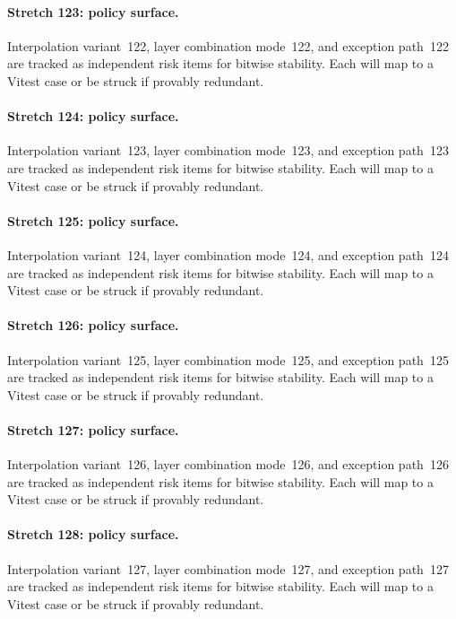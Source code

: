\documentclass[sigconf,nonacm]{acmart}
\begin{document}
\paragraph{Stretch 123: policy surface.}
Interpolation variant~122, layer combination mode~122, and exception path~122 are tracked as independent risk items for bitwise stability. Each will map to a Vitest case or be struck if provably redundant. %

\paragraph{Stretch 124: policy surface.}
Interpolation variant~123, layer combination mode~123, and exception path~123 are tracked as independent risk items for bitwise stability. Each will map to a Vitest case or be struck if provably redundant. %

\paragraph{Stretch 125: policy surface.}
Interpolation variant~124, layer combination mode~124, and exception path~124 are tracked as independent risk items for bitwise stability. Each will map to a Vitest case or be struck if provably redundant. %

\paragraph{Stretch 126: policy surface.}
Interpolation variant~125, layer combination mode~125, and exception path~125 are tracked as independent risk items for bitwise stability. Each will map to a Vitest case or be struck if provably redundant. %

\paragraph{Stretch 127: policy surface.}
Interpolation variant~126, layer combination mode~126, and exception path~126 are tracked as independent risk items for bitwise stability. Each will map to a Vitest case or be struck if provably redundant. %

\paragraph{Stretch 128: policy surface.}
Interpolation variant~127, layer combination mode~127, and exception path~127 are tracked as independent risk items for bitwise stability. Each will map to a Vitest case or be struck if provably redundant. %
\end{document}
